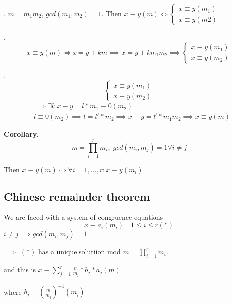 \Theorem.
$m = m_1 m_2$, $gcd(m_1, m_2) = 1$. Then $x \equiv y (m) \iff \begin{cases} x \equiv y (m_1) \\ x \equiv y (m2) \end{cases}$

\ProofForward.
\[
  x \equiv y (m) \iff x = y + km \implies x = y + k m_1 m_2 \implies
  \begin{cases}
    x \equiv y (m_1) \\
    x \equiv y (m_2) 
  \end{cases}
\]

\ProofBackward.
\[
  \begin{cases}
    x \equiv y (m_1) \\
    x \equiv y (m_2) 
  \end{cases}
\]
\begin{align*}
  & \implies \exists l: x-y = l* m_1 \equiv 0 (m_2)\\
  & l \equiv 0 (m_2) \implies l = l' * m_2 
    \implies x-y = l'* m_1 m_2
    \implies x \equiv y (m)
\end{align*}

\textbf{Corollary.}
\[
  m = \prod_{i=1}^r m_i,\; gcd(m_i, m_j) = 1 \forall i \neq j
\]

Then $x \equiv y (m) \iff \forall i = 1, \ldots, r : x \equiv y (m_i)$

\subsection{Chinese remainder theorem}
We are faced with a system of congruence equations
\[
  x \equiv a_i (m_i) \quad 1 \leq i \leq r (*)
\]
$i \neq j \implies gcd(m_i, m_j) = 1$

$\implies$ $(*)$ has a unique solutiion mod $m = \prod_{i = 1}^r m_i$.

and this is $x \equiv \sum_{j=1}^r \frac {m}{m_j} * b_j * a_j (m)$

where $b_j = \left( \frac{m}{m_j} \right) ^{-1} (m_j)$
